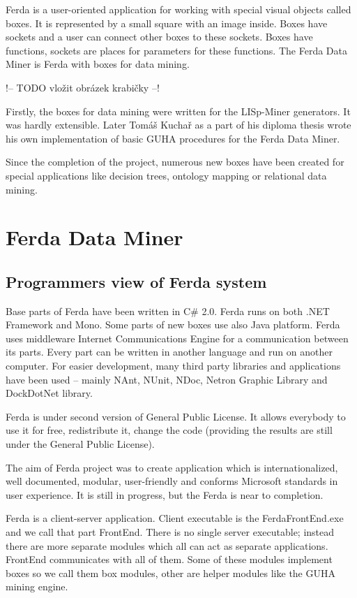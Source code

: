\documentclass[a4paper,12pt]{book}
\begin{document}
Ferda is a user-oriented application for working with special visual objects called boxes. It is represented by a small square with an image inside. Boxes have sockets and a user can connect other boxes to these sockets. Boxes have functions, sockets are places for parameters for these functions. The Ferda Data Miner is Ferda with boxes for data mining.

!-- TODO vložit obrázek krabičky --!

Firstly, the boxes for data mining were written for the LISp-Miner generators. It was hardly extensible. Later Tomáš Kuchař as a part of his diploma thesis \cite{thesisKuchar} wrote his own implementation of basic GUHA procedures for the Ferda Data Miner.

Since the completion of the project, numerous new boxes have been created for special applications like decision trees, ontology mapping or relational data mining.

\section{Ferda Data Miner}
\subsection{Programmers view of Ferda system}

Base parts of Ferda have been written in C\# 2.0. Ferda runs on both .NET Framework and Mono. Some parts of new boxes use also Java platform. Ferda uses middleware Internet Communications Engine for a communication between its parts. Every part can be written in another language and run on another computer. For easier development, many third party libraries and applications have been used -- mainly NAnt, NUnit, NDoc, Netron Graphic Library and DockDotNet library. 

Ferda is under second version of General Public License. It allows everybody to use it for free, redistribute it, change the code (providing the results are still under the General Public License).

The aim of Ferda project was to create application which is internationalized, well documented, modular, user-friendly and conforms Microsoft standards in user experience. It is still in progress, but the Ferda is near to completion.

Ferda is a client-server application. Client executable is the FerdaFrontEnd.exe and we call that part FrontEnd. There is no single server executable; instead there are more separate modules which all can act as separate applications. FrontEnd communicates with all of them. Some of these modules implement boxes so we call them box modules, other are helper modules like the GUHA mining engine.
\end{document}
